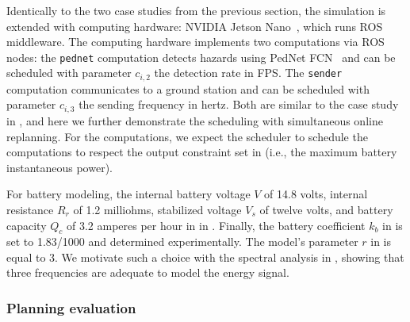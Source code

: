 Identically to the two case studies from the previous section, the simulation is extended with computing hardware: NVIDIA Jetson Nano~\citep{nano}, which runs ROS middleware. The computing hardware implements two computations via ROS nodes: the {\small\tt pednet} computation detects hazards using PedNet FCN~\citep{ullah2018pednet} and can be scheduled with parameter $c_{i,2}$ the detection rate in FPS. The {\small\tt sender} computation communicates to a ground station and can be scheduled with parameter $c_{i,3}$ the sending frequency in hertz. Both are similar to the case study in , and here we further demonstrate the scheduling with simultaneous online replanning. For the computations, we expect the scheduler to schedule the computations to respect the output constraint set in  (i.e., the maximum battery instantaneous power).

For battery modeling, the internal battery voltage $V$ of 14.8 volts, internal resistance $R_r$ of 1.2 milliohms, stabilized voltage $V_s$ of twelve volts, and battery capacity $Q_c$ of 3.2 amperes per hour in  in . Finally, the battery coefficient $k_b$ in  is set to 1.83/1000 and determined experimentally. The model's parameter $r$ in  is equal to 3. We motivate such a choice with the spectral analysis in , showing that three frequencies are adequate to model the energy signal.

\subsubsection*{Planning evaluation}

